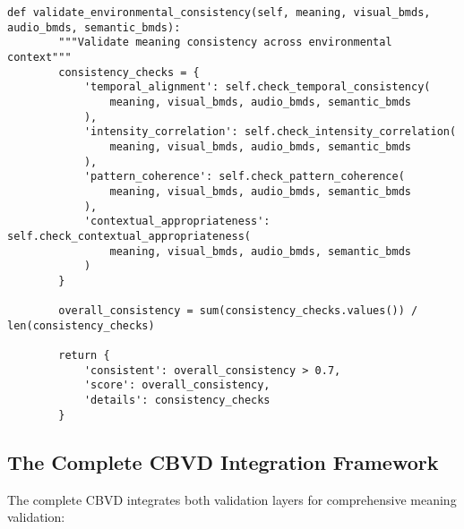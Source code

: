 \documentclass[12pt,a4paper]{article}
\begin{document}
\begin{lstlisting}[style=pythonstyle, caption=Cross-Modal BMD Process Validation]
    def validate_environmental_consistency(self, meaning, visual_bmds, audio_bmds, semantic_bmds):
        """Validate meaning consistency across environmental context"""
        consistency_checks = {
            'temporal_alignment': self.check_temporal_consistency(
                meaning, visual_bmds, audio_bmds, semantic_bmds
            ),
            'intensity_correlation': self.check_intensity_correlation(
                meaning, visual_bmds, audio_bmds, semantic_bmds
            ),
            'pattern_coherence': self.check_pattern_coherence(
                meaning, visual_bmds, audio_bmds, semantic_bmds
            ),
            'contextual_appropriateness': self.check_contextual_appropriateness(
                meaning, visual_bmds, audio_bmds, semantic_bmds
            )
        }
        
        overall_consistency = sum(consistency_checks.values()) / len(consistency_checks)
        
        return {
            'consistent': overall_consistency > 0.7,
            'score': overall_consistency,
            'details': consistency_checks
        }
\end{lstlisting}

\subsection{The Complete CBVD Integration Framework}

The complete CBVD integrates both validation layers for comprehensive meaning validation:
\end{document}

